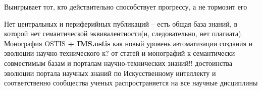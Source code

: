 {{\begin{scnitemize}
\item Выигрывает тот, кто действительно способствует прогрессу, а не тормозит его
\end{scnitemize}
Нет центральных и периферийных публикаций -- есть общая база знаний, в которой нет семантической эквивалентности(и, следовательно, нет плагиата). 
Монография OSTIS \textbf{+ IMS.ostis} как новый уровень автоматизации создания и эволюции научно-технического к?
	от статей и монографий к семантически совместимым базам и порталам научно-технических знаний!!
	достоинства эволюции портала научных знаний по Искусственному интеллекту и соответственно сообщества ученых распространяется на все научные дисциплины
}
}

\bigskip
\scnendstruct {}